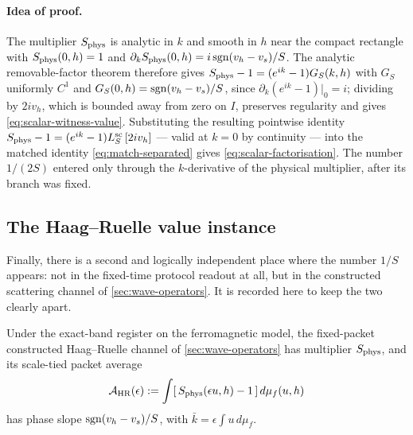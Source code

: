 \paragraph{Idea of proof.} The multiplier $S_{\rm phys}$ is analytic in $k$
and smooth in $h$ near the compact rectangle with $S_{\rm phys}(0,h)=1$ and
$\partial_kS_{\rm phys}(0,h)=i\operatorname{sgn}(v_h-v_s)/S$. The analytic removable-factor
theorem therefore gives $S_{\rm phys}-1=(e^{ik}-1)G_S(k,h)$ with $G_S$
uniformly $C^1$ and $G_S(0,h)=\operatorname{sgn}(v_h-v_s)/S$, since
$\partial_k(e^{ik}-1)|_0=i$; dividing by $2iv_h$, which is bounded away from
zero on $I$, preserves regularity and gives
\cref{eq:scalar-witness-value}. Substituting the resulting pointwise identity
$S_{\rm phys}-1=(e^{ik}-1)L_S^{\rm sc}\,[2iv_h]$ --- valid at $k=0$ by
continuity --- into the matched identity \cref{eq:match-separated} gives
\cref{eq:scalar-factorisation}. The number $1/(2S)$ entered only through the
$k$-derivative of the physical multiplier, after its branch was fixed.


\subsection{The Haag--Ruelle value instance}

Finally, there is a second and logically independent place where the number
$1/S$ appears: not in the fixed-time protocol readout at all, but in the
constructed scattering channel of \cref{sec:wave-operators}. It is recorded
here to keep the two clearly apart.

\begin{theorem}
\label{thm:hr-value}
\statusSketch

Under the exact-band register on the ferromagnetic model, the fixed-packet
constructed Haag--Ruelle channel of \cref{sec:wave-operators} has multiplier
$S_{\rm phys}$, and its scale-tied packet average
\begin{equation}
  \mathcal{A}_{\rm HR}(\epsilon):=
  \int[\,S_{\rm phys}(\epsilon u,h)-1\,]\,d\mu_f(u,h)
  \label{eq:hr-average}
\end{equation}
has phase slope $\operatorname{sgn}(v_h-v_s)/S$, with
$\bar k=\epsilon\int u\,d\mu_f$.
\end{theorem}

